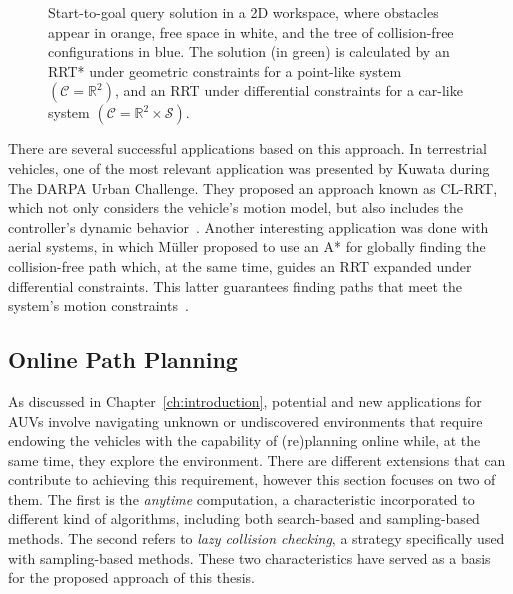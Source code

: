 \begin{figure}[htbp] \myfloatalign
	 \quad
\caption[Comparison between start-to-goal query solutions under geometric and
differential constraints over a 2D workspace.]
{Start-to-goal query solution in a \ac{2D} workspace, where obstacles appear in
orange, free space in white, and the tree of collision-free configurations in
blue. The solution (in green) is calculated by
\protect {} an \ac{RRT*} under geometric constraints
for a point-like system $\left(\mathcal{C} = \mathbb{R}^{2}\right)$,
and
\protect {} an \ac{RRT} under differential constraints
for a car-like system $\left(\mathcal{C} = \mathbb{R}^2 \times \mathcal{S} \right)$.}
\label{fig:PlannConst}
\end{figure}

There are several successful applications based on this approach. In terrestrial
vehicles, one of the most relevant application was presented by Kuwata \etal
during The DARPA Urban Challenge. They proposed an approach known as
\ac{CL-RRT}, which not only considers the vehicle's motion model, but also
includes the controller's dynamic behavior~\cite{Kuwata2009}. Another
interesting application was done with aerial systems, in which M\"uller \etal
proposed to use an A* for globally finding the collision-free path which, at the
same time, guides an \ac{RRT} expanded under differential constraints.
This latter guarantees finding paths that meet the system's motion
constraints~\cite{Muller2011}.

\subsection{Online Path Planning}

As discussed in Chapter~\ref{ch:introduction}, potential and new applications
for \acp{AUV} involve navigating unknown or undiscovered environments that
require endowing the vehicles with the capability of (re)planning online while,
at the same time, they explore the environment. There are different extensions
that can contribute to achieving this requirement, however this section focuses
on two of them. The first is the \textit{anytime} computation, a characteristic
incorporated to different kind of algorithms, including both search-based and
sampling-based methods. The second refers to \textit{lazy collision checking}, a
strategy specifically used with sampling-based methods. These two
characteristics have served as a basis for the proposed approach of this thesis.

